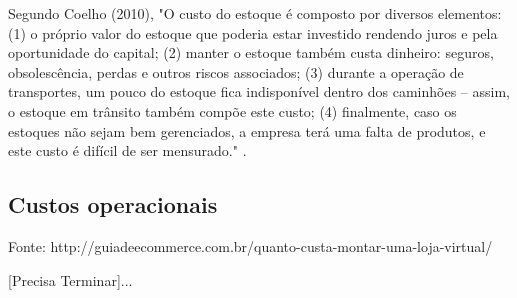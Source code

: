 Segundo Coelho (2010), "O custo do estoque é composto por diversos elementos: (1) o próprio valor do estoque que poderia estar investido rendendo juros e pela oportunidade do capital; (2) manter o estoque também custa dinheiro: seguros, obsolescência, perdas e outros riscos associados; (3) durante a operação de transportes, um pouco do estoque fica indisponível dentro dos caminhões – assim, o estoque em trânsito também compõe este custo; (4) finalmente, caso os estoques não sejam bem gerenciados, a empresa terá uma falta de produtos, e este custo é difícil de ser mensurado." \nocite{Coelho2010}.


\subsection{Custos operacionais}

Fonte: http://guiadeecommerce.com.br/quanto-custa-montar-uma-loja-virtual/
\cite{Guiadeecommerce2014}

[Precisa Terminar]...


